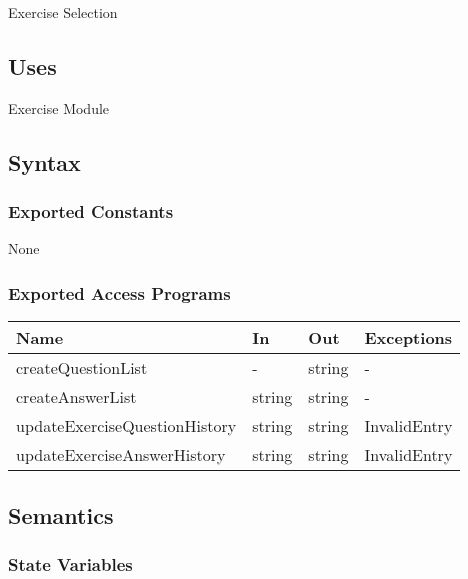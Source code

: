 \documentclass[12pt, titlepage]{article}
\begin{document}
Exercise Selection

\subsection{Uses}

Exercise Module

\subsection{Syntax}

\subsubsection{Exported Constants}

None

\subsubsection{Exported Access Programs}


\begin{center}
\begin{tabular}{p{6cm} p{2cm} p{2cm} p{4cm}}
\hline
\textbf{Name} & \textbf{In} & \textbf{Out} & \textbf{Exceptions} \\
\hline
createQuestionList & - & string & - \\
createAnswerList & string & string & - \\
updateExerciseQuestionHistory & string & string & InvalidEntry \\  %
updateExerciseAnswerHistory & string & string & InvalidEntry \\   %
\hline
\end{tabular}
\end{center}

\subsection{Semantics}

\subsubsection{State Variables}
\end{document}
